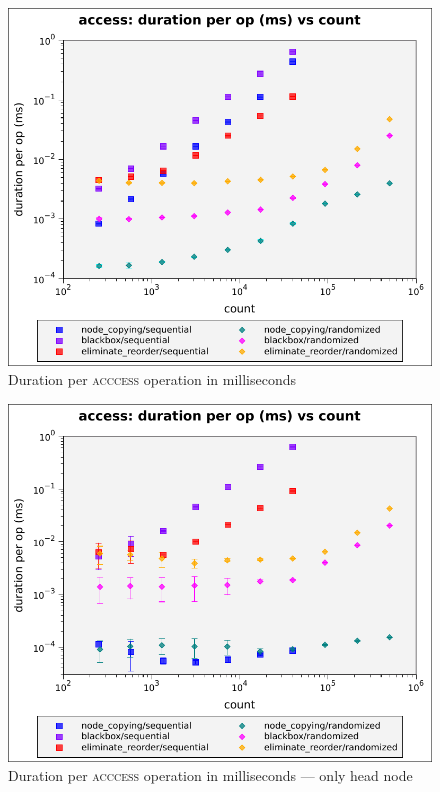 \documentclass{beamer}
\begin{document}
\begin{frame}
\begin{figure}
  \center
  \includegraphics[height=0.65\textheight]{figures/graphs/access-duration-per-op-vs-count.pdf}
  \caption{Duration per \textsc{acccess} operation in milliseconds}
\end{figure}
\end{frame}

\begin{frame}
\begin{figure}
  \center
  \includegraphics[height=0.65\textheight]{figures/graphs/access-duration-per-op-vs-count-head-only.pdf}
  \caption{Duration per \textsc{acccess} operation in milliseconds --- only head node}
\end{figure}
\end{frame}
\end{document}
